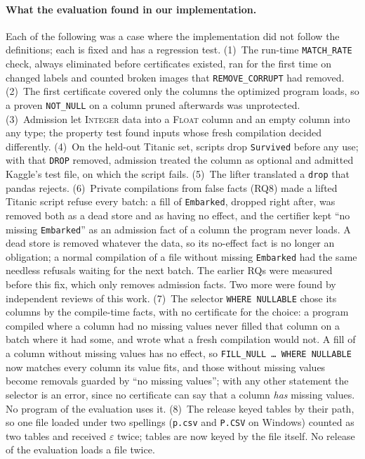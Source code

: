 \paragraph{What the evaluation found in our implementation.} Each of the following was a case where
the implementation did not follow the definitions; each is fixed and has a regression test. (1)~The
run-time \texttt{MATCH\_RATE} check, always eliminated before certificates existed, ran for the first
time on changed labels and counted broken images that \texttt{REMOVE\_CORRUPT} had removed. (2)~The
first certificate covered only the columns the optimized program loads, so a proven \texttt{NOT\_NULL}
on a column pruned afterwards was unprotected. (3)~Admission let \textsc{Integer} data into a
\textsc{Float} column and an empty column into any type; the property test found inputs whose fresh
compilation decided differently. (4)~On the held-out Titanic set, scripts drop \texttt{Survived} before
any use; with that \texttt{DROP} removed, admission treated the column as optional and admitted
Kaggle's test file, on which the script fails. (5)~The lifter translated a \texttt{drop} that pandas
rejects. (6)~Private compilations from false facts (RQ8) made a lifted Titanic script refuse every
batch: a fill of \texttt{Embarked}, dropped right after, was removed both as a dead store and as having
no effect, and the certifier kept ``no missing \texttt{Embarked}'' as an admission fact of a column the
program never loads. A dead store is removed whatever the data, so its no-effect fact is no longer an
obligation; a normal compilation of a file without missing \texttt{Embarked} had the same needless
refusals waiting for the next batch. The earlier RQs were measured before this fix, which only removes
admission facts. Two more were found by independent reviews of this work. (7)~The selector
\texttt{WHERE NULLABLE} chose its columns by the compile-time facts, with no certificate for the choice: a
program compiled where a column had no missing values never filled that column on a batch where it had
some, and wrote what a fresh compilation would not. A fill of a column without missing values has no
effect, so \texttt{FILL\_NULL \ldots\ WHERE NULLABLE} now matches every column its value fits, and those
without missing values become removals guarded by ``no missing values''; with any other statement the
selector is an error, since no certificate can say that a column \emph{has} missing values. No program
of the evaluation uses it. (8)~The release keyed tables by their path, so one file loaded under two
spellings (\texttt{p.csv} and \texttt{P.CSV} on Windows) counted as two tables and received $\varepsilon$
twice; tables are now keyed by the file itself. No release of the evaluation loads a file twice.

